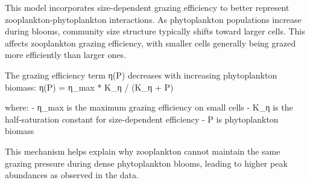 This model incorporates size-dependent grazing efficiency to better represent zooplankton-phytoplankton interactions. As phytoplankton populations increase during blooms, community size structure typically shifts toward larger cells. This affects zooplankton grazing efficiency, with smaller cells generally being grazed more efficiently than larger ones.

The grazing efficiency term η(P) decreases with increasing phytoplankton biomass:
η(P) = η_max * K_η / (K_η + P)

where:
- η_max is the maximum grazing efficiency on small cells
- K_η is the half-saturation constant for size-dependent efficiency
- P is phytoplankton biomass

This mechanism helps explain why zooplankton cannot maintain the same grazing pressure during dense phytoplankton blooms, leading to higher peak abundances as observed in the data.
